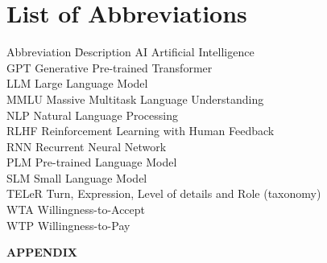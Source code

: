 \documentclass[12pt, a4paper, titlepage]{article}
\begin{document}
\newpage
\tableofcontents

\newpage
\section*{List of Abbreviations}
\begin{tabbing}
    Abbreviation \hspace{1cm} \= Description \kill
    AI \> Artificial Intelligence \\
    GPT \> Generative Pre-trained Transformer \\
    LLM \> Large Language Model \\
    MMLU \> Massive Multitask Language Understanding \\
    NLP \> Natural Language Processing \\
    RLHF \> Reinforcement Learning with Human Feedback \\
    RNN \> Recurrent Neural Network \\
    PLM \> Pre-trained Language Model \\
    SLM \> Small Language Model \\
    TELeR \> Turn, Expression, Level of details and Role (taxonomy) \\
    WTA \> Willingness-to-Accept \\
    WTP \> Willingness-to-Pay \\
\end{tabbing}

\newpage
\listoftables
{}

\newpage
\listoffigures
{}


\clearpage
{} %


\vspace{0.5cm}






\clearpage
{} %
\setcounter{page}{7}
\printbibliography

\newpage
\thispagestyle{empty}
\begin{center}
  \vspace*{\fill}
  {\Huge\textbf{APPENDIX}}
  \vspace*{\fill}
\end{center}
\newpage
\setcounter{page}{12}

\end{document}
